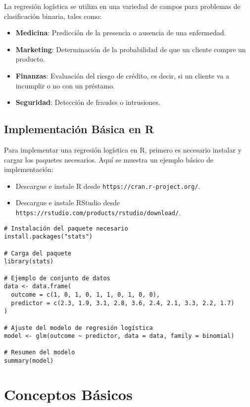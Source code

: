 \documentclass[a4paper]{report} %
\begin{document}
La regresión logística se utiliza en una variedad de campos para problemas de clasificación binaria, tales como:
\begin{itemize}
    \item \textbf{Medicina}: Predicción de la presencia o ausencia de una enfermedad.
    \item \textbf{Marketing}: Determinación de la probabilidad de que un cliente compre un producto.
    \item \textbf{Finanzas}: Evaluación del riesgo de crédito, es decir, si un cliente va a incumplir o no con un préstamo.
    \item \textbf{Seguridad}: Detección de fraudes o intrusiones.
\end{itemize}

\subsection{Implementación Básica en R}

Para implementar una regresión logística en R, primero es necesario instalar y cargar los paquetes necesarios. Aquí se muestra un ejemplo básico de implementación:

\begin{itemize}
    \item Descargue e instale R desde \texttt{https://cran.r-project.org/}.
    \item Descargue e instale RStudio desde \texttt{https://rstudio.com/products/rstudio/download/}.
\end{itemize}

\begin{verbatim}
# Instalación del paquete necesario
install.packages("stats")

# Carga del paquete
library(stats)

# Ejemplo de conjunto de datos
data <- data.frame(
  outcome = c(1, 0, 1, 0, 1, 1, 0, 1, 0, 0),
  predictor = c(2.3, 1.9, 3.1, 2.8, 3.6, 2.4, 2.1, 3.3, 2.2, 1.7)
)

# Ajuste del modelo de regresión logística
model <- glm(outcome ~ predictor, data = data, family = binomial)

# Resumen del modelo
summary(model)
\end{verbatim}

\section{Conceptos Básicos}
\end{document}
